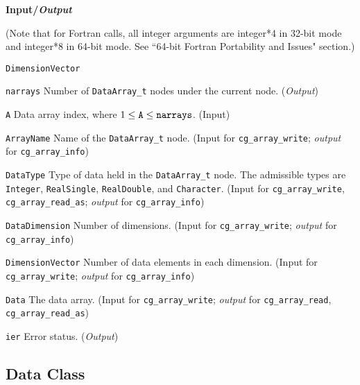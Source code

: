 \noindent
\textbf{\textcolor{input}{Input}/\textcolor{output}{\textit{Output}}}

\noindent (Note that for Fortran calls, all integer arguments are integer*4 in 32-bit mode and integer*8 in 64-bit mode.
See ``64-bit Fortran Portability and Issues" section.)

\begin{Ventryi}{\texttt{DimensionVector}}\raggedright
\item [\texttt{narrays}]
      Number of \texttt{DataArray\_t} nodes under the current node.
      (\textcolor{output}{\textit{Output}})
\item [\texttt{A}]
      Data array index, where $1 \leq \text{\texttt{A}} \leq \text{\texttt{narrays}}$.
      (\textcolor{input}{Input})
\item [\texttt{ArrayName}]
      Name of the \texttt{DataArray\_t} node.
      (\textcolor{input}{Input} for \texttt{cg\_array\_write};
      \textcolor{output}{\textit{output}} for \texttt{cg\_array\_info})
\item [\texttt{DataType}]
      Type of data held in the \texttt{DataArray\_t} node.
      The admissible types are \texttt{Integer}, \texttt{RealSingle},
      \texttt{RealDouble}, and \texttt{Character}.
      (\textcolor{input}{Input} for \texttt{cg\_array\_write},
      \texttt{cg\_array\_read\_as}; \textcolor{output}{\textit{output}} for
      \texttt{cg\_array\_info})
\item [\texttt{DataDimension}]
      Number of dimensions.
      (\textcolor{input}{Input} for \texttt{cg\_array\_write};
      \textcolor{output}{\textit{output}} for \texttt{cg\_array\_info})
\item [\texttt{DimensionVector}]
      Number of data elements in each dimension.
      (\textcolor{input}{Input} for \texttt{cg\_array\_write};
      \textcolor{output}{\textit{output}} for \texttt{cg\_array\_info})
\item [\texttt{Data}]
      The data array.
      (\textcolor{input}{Input} for \texttt{cg\_array\_write};
      \textcolor{output}{\textit{output}} for \texttt{cg\_array\_read},
      \texttt{cg\_array\_read\_as})
\item [\texttt{ier}]
      Error status.
      (\textcolor{output}{\textit{Output}})
\end{Ventryi}

\newpage
\subsection{Data Class}
\label{s:dataclass}

